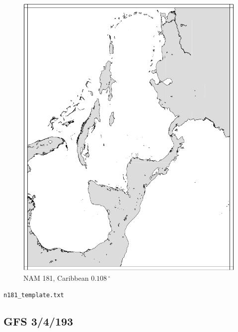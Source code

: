 \documentclass[11pt]{article}   %
\begin{document}
\begin{figure}[htbp]\begin{center}
 \includegraphics[angle=-90,scale=0.9]{Figs/n181.pdf}
\parbox{15cm}{\caption{\label{FigNAM181}
NAM 181, Caribbean $0.108  \, ^{\circ}$
}}
\end{center}\end{figure}
\clearpage
\verb|n181_template.txt| \\
\tiny  \normalsize


\clearpage
\subsection{GFS 3/4/193}
\end{document}
